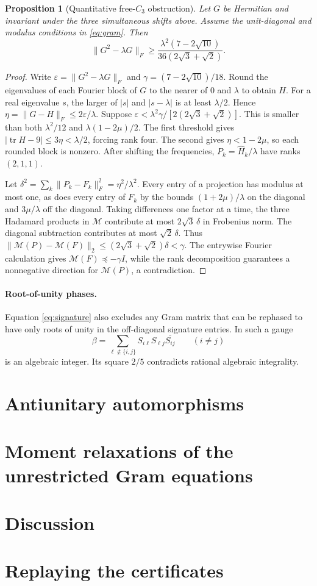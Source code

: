 \documentclass[11pt]{article}
\newtheorem{proposition}[theorem]{Proposition}
\newcommand{\tr}{\operatorname{tr}}
\begin{document}
\begin{proposition}[Quantitative free-$C_3$ obstruction]\label{prop:c3residual}
Let $G$ be Hermitian and invariant under the three simultaneous shifts above. Assume the unit-diagonal and modulus conditions in \eqref{eq:gram}. Then
\[
 \|G^2-\lambda G\|_F\ge
 \frac{\lambda^2(7-2\sqrt{10})}{36(2\sqrt3+\sqrt2)}.
\]
\end{proposition}
\begin{proof}
Write $\varepsilon=\|G^2-\lambda G\|_F$ and $\gamma=(7-2\sqrt{10})/18$. Round the eigenvalues of each Fourier block of $G$ to the nearer of $0$ and $\lambda$ to obtain $H$. For a real eigenvalue $s$, the larger of $|s|$ and $|s-\lambda|$ is at least $\lambda/2$. Hence $\eta=\|G-H\|_F\le2\varepsilon/\lambda$. Suppose $\varepsilon<\lambda^2\gamma/[2(2\sqrt3+\sqrt2)]$. This is smaller than both $\lambda^2/12$ and $\lambda(1-2\mu)/2$. The first threshold gives $|\tr H-9|\le3\eta<\lambda/2$, forcing rank four. The second gives $\eta<1-2\mu$, so each rounded block is nonzero. After shifting the frequencies, $P_k=\widehat H_k/\lambda$ have ranks $(2,1,1)$.

Let $\delta^2=\sum_k\|P_k-F_k\|_F^2=\eta^2/\lambda^2$. Every entry of a projection has modulus at most one, as does every entry of $F_k$ by the bounds $(1+2\mu)/\lambda$ on the diagonal and $3\mu/\lambda$ off the diagonal. Taking differences one factor at a time, the three Hadamard products in $\mathcal M$ contribute at most $2\sqrt3\,\delta$ in Frobenius norm. The diagonal subtraction contributes at most $\sqrt2\,\delta$. Thus $\|\mathcal M(P)-\mathcal M(F)\|_2\le(2\sqrt3+\sqrt2)\delta<\gamma$. The entrywise Fourier calculation gives $\mathcal M(F)\preceq-\gamma I$, while the rank decomposition guarantees a nonnegative direction for $\mathcal M(P)$, a contradiction.
\end{proof}

\paragraph{Root-of-unity phases.}
Equation \eqref{eq:signature} also excludes any Gram matrix that can be rephased to have only roots of unity in the off-diagonal signature entries. In such a gauge
\[
 \beta=\sum_{\ell\notin\{i,j\}} S_{i\ell}S_{\ell j}\overline{S_{ij}}
 \qquad (i\ne j)
\]
is an algebraic integer. Its square $2/5$ contradicts rational algebraic integrality.

\section{Antiunitary automorphisms}\label{sec:anti}


\section{Moment relaxations of the unrestricted Gram equations}\label{sec:moments}


\section{Discussion}\label{sec:discussion}


\appendix
\section{Replaying the certificates}\label{app:replay}



\end{document}
